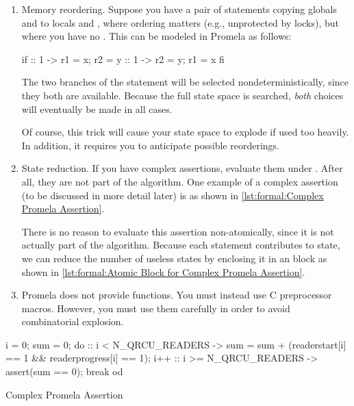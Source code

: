 \begin{enumerate}
\item	Memory reordering.
	Suppose you have a pair of statements copying globals  and 
	to locals  and , where ordering matters (e.g., unprotected
	by locks), but where you have no .
	This can be modeled in Promela as follows:

\begin{VerbatimN}[samepage=true]
if
:: 1 -> r1 = x;
        r2 = y
:: 1 -> r2 = y;
        r1 = x
fi
\end{VerbatimN}

	The two branches of the  statement will be selected
	nondeterministically, since they both are available.
	Because the full state space is searched, \emph{both} choices
	will eventually be made in all cases.

	Of course, this trick will cause your state space to explode
	if used too heavily.
	In addition, it requires you to anticipate possible reorderings.

\item	State reduction.
	If you have complex assertions, evaluate them under .
	After all, they are not part of the algorithm.
	One example of a complex assertion (to be discussed in more
	detail later) is as shown in
	\cref{lst:formal:Complex Promela Assertion}.

	There is no reason to evaluate this assertion
	non-atomically, since it is not actually part of the algorithm.
	Because each statement contributes to state, we can reduce
	the number of useless states by enclosing it in an 
	block as shown in
	\cref{lst:formal:Atomic Block for Complex Promela Assertion}.

\item	Promela does not provide functions.
	You must instead use C preprocessor macros.
	However, you must use them carefully in order to avoid
	combinatorial explosion.
\end{enumerate}

\begin{listing}
\begin{VerbatimL}
i = 0;
sum = 0;
do
:: i < N_QRCU_READERS ->
	sum = sum + (readerstart[i] == 1 &&
	             readerprogress[i] == 1);
	i++
:: i >= N_QRCU_READERS ->
	assert(sum == 0);
	break
od
\end{VerbatimL}
\caption{Complex Promela Assertion}
\label{lst:formal:Complex Promela Assertion}
\end{listing}


